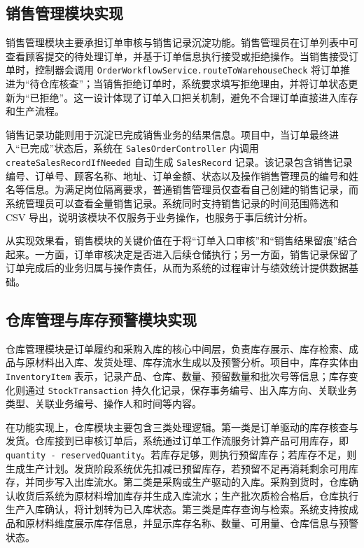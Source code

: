 \subsection{销售管理模块实现}

销售管理模块主要承担订单审核与销售记录沉淀功能。销售管理员在订单列表中可查看顾客提交的待处理订单，并基于订单信息执行接受或拒绝操作。当销售接受订单时，控制器会调用 \texttt{OrderWorkflowService.routeToWarehouseCheck} 将订单推进为“待仓库核查”；当销售拒绝订单时，系统要求填写拒绝理由，并将订单状态更新为“已拒绝”。这一设计体现了订单入口把关机制，避免不合理订单直接进入库存和生产流程。

销售记录功能则用于沉淀已完成销售业务的结果信息。项目中，当订单最终进入“已完成”状态后，系统在 \texttt{SalesOrderController} 内调用 \texttt{createSalesRecordIfNeeded} 自动生成 \texttt{SalesRecord} 记录。该记录包含销售记录编号、订单号、顾客名称、地址、订单金额、状态以及操作销售管理员的编号和姓名等信息。为满足岗位隔离要求，普通销售管理员仅查看自己创建的销售记录，而系统管理员可以查看全量销售记录。系统同时支持销售记录的时间范围筛选和 CSV 导出，说明该模块不仅服务于业务操作，也服务于事后统计分析。

从实现效果看，销售模块的关键价值在于将“订单入口审核”和“销售结果留痕”结合起来。一方面，订单审核决定是否进入后续仓储执行；另一方面，销售记录保留了订单完成后的业务归属与操作责任，从而为系统的过程审计与绩效统计提供数据基础。

\subsection{仓库管理与库存预警模块实现}

仓库管理模块是订单履约和采购入库的核心中间层，负责库存展示、库存检索、成品与原材料出入库、发货处理、库存流水生成以及预警分析。项目中，库存实体由 \texttt{InventoryItem} 表示，记录产品、仓库、数量、预留数量和批次号等信息；库存变化则通过 \texttt{StockTransaction} 持久化记录，保存事务编号、出入库方向、关联业务类型、关联业务编号、操作人和时间等内容。

在功能实现上，仓库模块主要包含三类处理逻辑。第一类是订单驱动的库存核查与发货。仓库接到已审核订单后，系统通过订单工作流服务计算产品可用库存，即 \texttt{quantity - reservedQuantity}。若库存足够，则执行预留库存；若库存不足，则生成生产计划。发货阶段系统优先扣减已预留库存，若预留不足再消耗剩余可用库存，并同步写入出库流水。第二类是采购或生产驱动的入库。采购到货时，仓库确认收货后系统为原材料增加库存并生成入库流水；生产批次质检合格后，仓库执行生产入库确认，将计划转为已入库状态。第三类是库存查询与检索。系统支持按成品和原材料维度展示库存信息，并显示库存名称、数量、可用量、仓库信息与预警状态。

